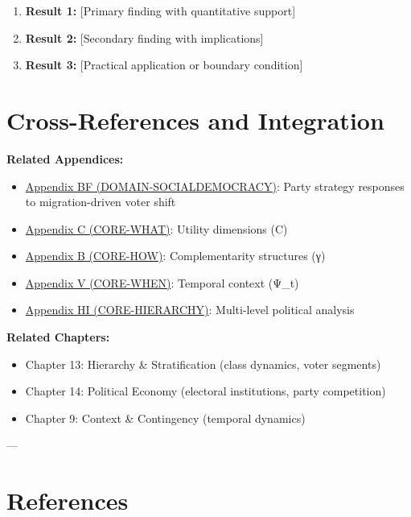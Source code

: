 \begin{enumerate}
    \item \textbf{Result 1:} [Primary finding with quantitative support]
    \item \textbf{Result 2:} [Secondary finding with implications]
    \item \textbf{Result 3:} [Practical application or boundary condition]
\end{enumerate}


\section{Cross-References and Integration}
\label{sec:crossref}

\textbf{Related Appendices:}

\begin{itemize}
\item \hyperref[app:domain-socialdemocracy]{Appendix BF (DOMAIN-SOCIALDEMOCRACY)}: Party strategy responses to migration-driven voter shift
\item \hyperref[app:core-what]{Appendix C (CORE-WHAT)}: Utility dimensions (C)
\item \hyperref[app:core-how]{Appendix B (CORE-HOW)}: Complementarity structures (γ)
\item \hyperref[app:core-when]{Appendix V (CORE-WHEN)}: Temporal context (Ψ_t)
\item \hyperref[app:core-hierarchy]{Appendix HI (CORE-HIERARCHY)}: Multi-level political analysis
\end{itemize}

\textbf{Related Chapters:}

\begin{itemize}
\item Chapter 13: Hierarchy \& Stratification (class dynamics, voter segments)
\item Chapter 14: Political Economy (electoral institutions, party competition)
\item Chapter 9: Context \& Contingency (temporal dynamics)
\end{itemize}

---

\clearpage


\section{References}
\label{sec:references}

